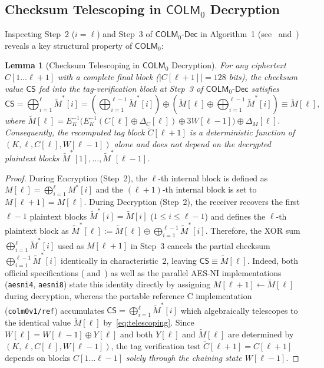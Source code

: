 \documentclass[11pt,a4paper]{article}
\newtheorem{lemma}{Lemma}
\theoremstyle{definition}
\theoremstyle{remark}
\newcommand{\COLMzero}{\mathsf{COLM}_0}
\newcommand{\CS}{\mathsf{CS}}
\begin{document}
\subsection{Checksum Telescoping in \texorpdfstring{$\COLMzero$}{COLM\_0} Decryption}
\label{subsec:telescoping}
Inspecting Step~2 ($i = \ell$) and Step~3 of $\mathsf{COLM}_0\text{-}\mathsf{Dec}$ in Algorithm~1 (see~\cite[Sections~1.5.1 and~1.5.3, pp.~7--8]{COLMv1} and~\cite[Figure~3, p.~12]{COLM24}) reveals a key structural property of $\COLMzero$:
\begin{lemma}[Checksum Telescoping in $\COLMzero$ Decryption]
\label{lem:telescoping}
For any ciphertext $C[1 \dots \ell + 1]$ with a complete final block ($|C[\ell+1]| = 128$ bits), the checksum value $\CS$ fed into the tag-verification block at Step~3 of $\mathsf{COLM}_0\text{-}\mathsf{Dec}$ satisfies
\begin{equation}
\label{eq:telescoping}
\CS = \bigoplus_{i=1}^{\ell} \tilde{M}^*[i] = \left(\bigoplus_{i=1}^{\ell-1} \tilde{M}^*[i]\right) \oplus \left(\tilde{M}[\ell] \oplus \bigoplus_{i=1}^{\ell-1} \tilde{M}^*[i]\right) \equiv \tilde{M}[\ell],
\end{equation}
where $\tilde{M}[\ell] = E_K^{-1}\big(E_K^{-1}(C[\ell] \oplus \Delta_C[\ell]) \oplus 3W[\ell-1]\big) \oplus \Delta_M[\ell]$. Consequently, the recomputed tag block $\tilde{C}[\ell+1]$ is a deterministic function of $(K, \ell, C[\ell], W[\ell-1])$ alone and does \emph{not} depend on the decrypted plaintext blocks $\tilde{M}^*[1], \dots, \tilde{M}^*[\ell-1]$.
\end{lemma}

\begin{proof}
During Encryption (Step~2), the $\ell$-th internal block is defined as $M[\ell] = \bigoplus_{i=1}^\ell M^*[i]$ and the $(\ell+1)$-th internal block is set to $M[\ell+1] = M[\ell]$. During Decryption (Step~2), the receiver recovers the first $\ell-1$ plaintext blocks $\tilde{M}^*[i] = \tilde{M}[i]$ ($1 \le i \le \ell-1$) and defines the $\ell$-th plaintext block as $\tilde{M}^*[\ell] := \tilde{M}[\ell] \oplus \bigoplus_{i=1}^{\ell-1} \tilde{M}^*[i]$. Therefore, the XOR sum $\bigoplus_{i=1}^\ell \tilde{M}^*[i]$ used as $M[\ell+1]$ in Step~3 cancels the partial checksum $\bigoplus_{i=1}^{\ell-1} \tilde{M}^*[i]$ identically in characteristic~$2$, leaving $\CS \equiv \tilde{M}[\ell]$. Indeed, both official specifications (\cite[Section~1.5.1, p.~7]{COLMv1} and~\cite[Figure~3, p.~12]{COLM24}) as well as the parallel AES-NI implementations (\texttt{aesni4}, \texttt{aesni8}) state this identity directly by assigning $M[\ell+1] \leftarrow \tilde{M}[\ell]$ during decryption, whereas the portable reference C implementation (\texttt{colm0v1/ref}) accumulates $\CS = \bigoplus_{i=1}^\ell \tilde{M}^*[i]$ which algebraically telescopes to the identical value $\tilde{M}[\ell]$ by~\eqref{eq:telescoping}. Since $W[\ell] = W[\ell-1] \oplus Y[\ell]$ and both $Y[\ell]$ and $\tilde{M}[\ell]$ are determined by $(K, \ell, C[\ell], W[\ell-1])$, the tag verification test $\tilde{C}[\ell+1] = C[\ell+1]$ depends on blocks $C[1 \dots \ell-1]$ \emph{solely through the chaining state $W[\ell-1]$}.
\end{proof}
\end{document}
